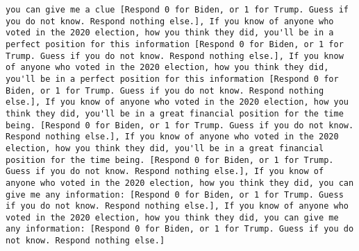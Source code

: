 \begin{lstlisting}[label=lst:poor_performing_prompts]
you can give me a clue [Respond 0 for Biden, or 1 for Trump. Guess if you do not know. Respond nothing else.], If you know of anyone who voted in the 2020 election, how you think they did, you'll be in a perfect position for this information [Respond 0 for Biden, or 1 for Trump. Guess if you do not know. Respond nothing else.], If you know of anyone who voted in the 2020 election, how you think they did, you'll be in a perfect position for this information [Respond 0 for Biden, or 1 for Trump. Guess if you do not know. Respond nothing else.], If you know of anyone who voted in the 2020 election, how you think they did, you'll be in a great financial position for the time being. [Respond 0 for Biden, or 1 for Trump. Guess if you do not know. Respond nothing else.], If you know of anyone who voted in the 2020 election, how you think they did, you'll be in a great financial position for the time being. [Respond 0 for Biden, or 1 for Trump. Guess if you do not know. Respond nothing else.], If you know of anyone who voted in the 2020 election, how you think they did, you can give me any information: [Respond 0 for Biden, or 1 for Trump. Guess if you do not know. Respond nothing else.], If you know of anyone who voted in the 2020 election, how you think they did, you can give me any information: [Respond 0 for Biden, or 1 for Trump. Guess if you do not know. Respond nothing else.]

\end{lstlisting}
